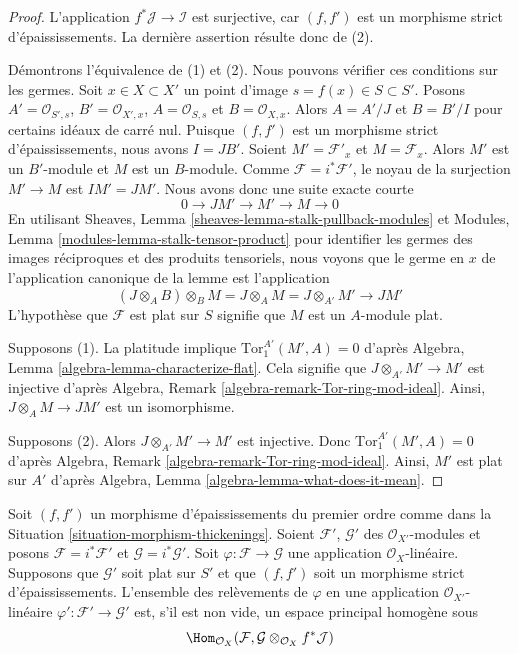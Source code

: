 \begin{proof}
L'application $f^*\mathcal{J} \to \mathcal{I}$ est surjective,
car $(f, f')$ est un morphisme strict d'épaississements.
La dernière assertion résulte donc de (2).

\medskip\noindent
Démontrons l'équivalence de (1) et (2). Nous pouvons vérifier ces conditions
sur les germes. Soit $x \in X \subset X'$
un point d'image $s = f(x) \in S \subset S'$.
Posons $A' = \mathcal{O}_{S', s}$, $B' = \mathcal{O}_{X', x}$,
$A = \mathcal{O}_{S, s}$ et $B = \mathcal{O}_{X, x}$.
Alors $A = A'/J$ et $B = B'/I$ pour certains idéaux de carré nul.
Puisque $(f, f')$ est un morphisme strict d'épaississements, nous avons
$I = JB'$.
Soient $M' = \mathcal{F}'_x$ et $M = \mathcal{F}_x$.
Alors $M'$ est un $B'$-module et $M$ est un $B$-module.
Comme $\mathcal{F} = i^*\mathcal{F}'$, le noyau de la
surjection $M' \to M$ est $IM' = JM'$. Nous avons donc une suite exacte
courte
$$
0 \to JM' \to M' \to M \to 0
$$
En utilisant
Sheaves, Lemma \ref{sheaves-lemma-stalk-pullback-modules}
et
Modules, Lemma \ref{modules-lemma-stalk-tensor-product}
pour identifier les germes des images réciproques et des produits tensoriels, nous voyons
que le germe en $x$ de l'application canonique de la lemme est l'application
$$
(J \otimes_A B) \otimes_B M = J \otimes_A M = J \otimes_{A'} M'
\longrightarrow JM'
$$
L'hypothèse que $\mathcal{F}$ est plat sur $S$ signifie que
$M$ est un $A$-module plat.

\medskip\noindent
Supposons (1). La platitude implique
$\text{Tor}_1^{A'}(M', A) = 0$ d'après
Algebra, Lemma \ref{algebra-lemma-characterize-flat}.
Cela signifie que $J \otimes_{A'} M' \to M'$ est injective d'après
Algebra, Remark \ref{algebra-remark-Tor-ring-mod-ideal}.
Ainsi, $J \otimes_A M \to JM'$ est un isomorphisme.

\medskip\noindent
Supposons (2). Alors $J \otimes_{A'} M' \to M'$ est injective. Donc
$\text{Tor}_1^{A'}(M', A) = 0$ d'après
Algebra, Remark \ref{algebra-remark-Tor-ring-mod-ideal}.
Ainsi, $M'$ est plat sur $A'$ d'après
Algebra, Lemma \ref{algebra-lemma-what-does-it-mean}.
\end{proof}

\begin{lemma}
\label{lemma-inf-map-rel}
Soit $(f, f')$ un morphisme d'épaississements du premier ordre comme dans la
Situation \ref{situation-morphism-thickenings}.
Soient $\mathcal{F}'$, $\mathcal{G}'$ des $\mathcal{O}_{X'}$-modules et posons
$\mathcal{F} = i^*\mathcal{F}'$ et $\mathcal{G} = i^*\mathcal{G}'$.
Soit $\varphi : \mathcal{F} \to \mathcal{G}$ une application
$\mathcal{O}_X$-linéaire.
Supposons que $\mathcal{G}'$ soit plat sur $S'$ et que
$(f, f')$ soit un morphisme strict d'épaississements.
L'ensemble des relèvements de $\varphi$ en une application
$\mathcal{O}_{X'}$-linéaire
$\varphi' : \mathcal{F}' \to \mathcal{G}'$ est, s'il est non vide, un espace
principal homogène sous
$$
\Hom_{\mathcal{O}_X}(\mathcal{F},
\mathcal{G} \otimes_{\mathcal{O}_X} f^*\mathcal{J})
$$
\end{lemma}


